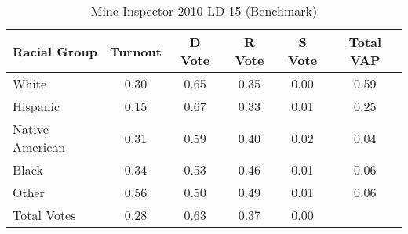 \begin{table}[htb]
\begin{center}
\caption{Mine Inspector 2010 LD 15 (Benchmark)}
\label{smine_vap_ld_15_benchmark}
\begin{tabular}{lccccc}
  \hline
Racial Group & Turnout & D Vote & R Vote & S Vote & Total VAP \\ 
  \hline
White & 0.30 & 0.65 & 0.35 & 0.00 & 0.59 \\ 
  Hispanic & 0.15 & 0.67 & 0.33 & 0.01 & 0.25 \\ 
  Native American & 0.31 & 0.59 & 0.40 & 0.02 & 0.04 \\ 
  Black & 0.34 & 0.53 & 0.46 & 0.01 & 0.06 \\ 
  Other & 0.56 & 0.50 & 0.49 & 0.01 & 0.06 \\ 
  Total Votes & 0.28 & 0.63 & 0.37 & 0.00 &  \\ 
   \hline
\end{tabular}
\end{center}
\end{table}
